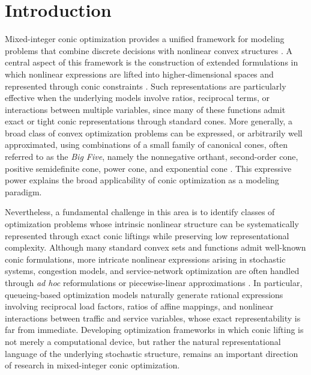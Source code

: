 \documentclass[a4paper,11pt,reqno]{amsart}
\begin{document}
\section{Introduction}

Mixed-integer conic optimization provides a unified framework for modeling problems that combine discrete decisions with nonlinear convex structures \citep{BenTalNemirovski2001,BoydVandenberghe2004}. A central aspect of this framework is the construction of extended formulations in which nonlinear expressions are lifted into higher-dimensional spaces and represented through conic constraints \citep{conforti2010extended,vielma2015mixed}. Such representations are particularly effective when the underlying models involve ratios, reciprocal terms, or interactions between multiple variables, since many of these functions admit exact or tight conic representations through standard cones. More generally, a broad class of convex optimization problems can be expressed, or arbitrarily well approximated, using combinations of a small family of canonical cones, often referred to as the \emph{Big Five}, namely the nonnegative orthant, second-order cone, positive semidefinite cone, power cone, and exponential cone \citep{bertsimas2026cone}. This expressive power explains the broad applicability of conic optimization as a modeling paradigm.

Nevertheless, a fundamental challenge in this area is to identify classes of optimization problems whose intrinsic nonlinear structure can be systematically represented through exact conic liftings while preserving low representational complexity. Although many standard convex sets and functions admit well-known conic formulations, more intricate nonlinear expressions arising in stochastic systems, congestion models, and service-network optimization are often handled through {\it ad hoc} reformulations or piecewise-linear approximations \citep{pham2025exponential,atamturk2010conic}. In particular, queueing-based optimization models naturally generate rational expressions involving reciprocal load factors, ratios of affine mappings, and nonlinear interactions between traffic and service variables, whose exact representability is far from immediate. Developing optimization frameworks in which conic lifting is not merely a computational device, but rather the natural representational language of the underlying stochastic structure, remains an important direction of research in mixed-integer conic optimization.
\end{document}
